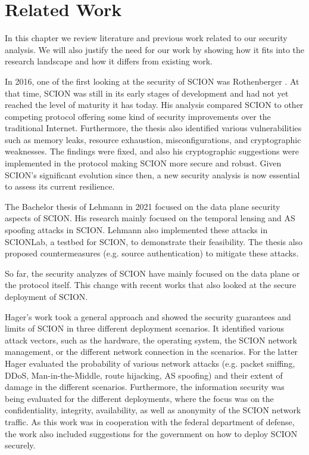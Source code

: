 \chapter{Related Work}
\label{ch:related-work}


In this chapter we review literature and previous work related to our security analysis.
We will also justify the need for our work by showing how it fits into the research landscape and how it differs from existing work.

In 2016, one of the first looking at the security of SCION was Rothenberger \cite{Rothenberger2016}.
At that time, SCION was still in its early stages of development and had not yet reached the level of maturity it has today.
His analysis compared SCION to other competing protocol offering some kind of security improvements over the traditional Internet.
Furthermore, the thesis also identified various vulnerabilities such as memory leaks, resource exhaustion, misconfigurations, and cryptographic weaknesses.
The findings were fixed, and also his cryptographic suggestions were implemented in the protocol making SCION more secure and robust.
Given SCION's significant evolution since then, a new security analysis is now essential to assess its current resilience.


The Bachelor thesis of Lehmann \cite{Lehmann2021} in 2021 focused on the data plane security aspects of SCION.
His research mainly focused on the temporal lensing and AS spoofing attacks in SCION.
Lehmann also implemented these attacks in SCIONLab, a testbed for SCION, to demonstrate their feasibility.
The thesis also proposed countermeasures (e.g. source authentication) to mitigate these attacks.


So far, the security analyzes of SCION have mainly focused on the data plane or the protocol itself.
This change with recent works that also looked at the secure deployment of SCION.

Hager's work \cite{Hager2024} took a general approach and showed the security guarantees and limits of SCION in three different deployment scenarios.
It identified various attack vectors, such as the hardware, the operating system, the SCION network management, or the different network connection in the scenarios.
For the latter Hager evaluated the probability of various network attacks (e.g. packet sniffing, DDoS, Man-in-the-Middle, route hijacking, AS spoofing) and their extent of damage in the different scenarios.
Furthermore, the information security was being evaluated for the different deployments, where the focus was on the confidentiality, integrity, availability, as well as anonymity of the SCION network traffic.
As this work was in cooperation with the federal department of defense, the work also included suggestions for the government on how to deploy SCION securely.


